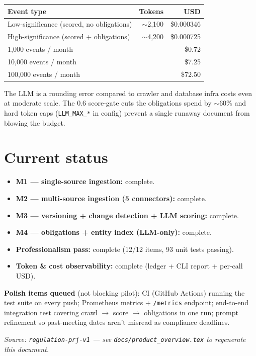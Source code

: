 \documentclass[11pt,a4paper]{article}
\begin{document}
\begin{center}
\small
\begin{tabular}{lrr}
\toprule
\textbf{Event type}                         & \textbf{Tokens} & \textbf{USD} \\
\midrule
Low-significance (scored, no obligations)   & $\sim$2{,}100   & \$0.000346 \\
High-significance (scored + obligations)    & $\sim$4{,}200   & \$0.000725 \\
\midrule
1{,}000 events / month                       &                 & \$0.72 \\
10{,}000 events / month                      &                 & \$7.25 \\
100{,}000 events / month                     &                 & \$72.50 \\
\bottomrule
\end{tabular}
\end{center}

The LLM is a rounding error compared to crawler and database infra
costs even at moderate scale. The 0.6 score-gate cuts the
obligations spend by $\sim$60\% and hard token caps
(\texttt{LLM\_MAX\_*} in config) prevent a single runaway document
from blowing the budget.

\section{Current status}

\begin{itemize}[leftmargin=1.4em,itemsep=2pt]
  \item \textbf{M1 --- single-source ingestion:} complete.
  \item \textbf{M2 --- multi-source ingestion (5 connectors):} complete.
  \item \textbf{M3 --- versioning + change detection + LLM scoring:} complete.
  \item \textbf{M4 --- obligations + entity index (LLM-only):} complete.
  \item \textbf{Professionalism pass:} complete
        (12/12 items, 93 unit tests passing).
  \item \textbf{Token \& cost observability:} complete
        (ledger + CLI report + per-call USD).
\end{itemize}

\noindent\textbf{Polish items queued} (not blocking pilot):
CI (GitHub Actions) running the test suite on every push;
Prometheus metrics + \texttt{/metrics} endpoint;
end-to-end integration test covering crawl $\to$ score $\to$
obligations in one run;
prompt refinement so past-meeting dates aren't misread as compliance
deadlines.

\vspace{0.5cm}
\begin{center}
\small\itshape
Source: \texttt{regulation-prj-v1} --- see
\texttt{docs/product\_overview.tex} to regenerate this document.
\end{center}
\end{document}
